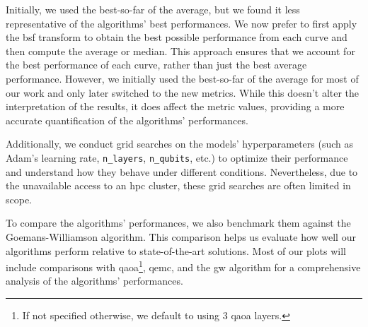 Initially, we used the best-so-far of the average, but we found it less representative of the algorithms' best performances. We now prefer to first apply the \acrshort{bsf} transform to obtain the best possible performance from each curve and then compute the average or median. This approach ensures that we account for the best performance of each curve, rather than just the best average performance. However, we initially used the best-so-far of the average for most of our work and only later switched to the new metrics. While this doesn't alter the interpretation of the results, it does affect the metric values, providing a more accurate quantification of the algorithms' performances.

Additionally, we conduct grid searches on the models' hyperparameters (such as Adam's learning rate, \texttt{n\_layers}, \texttt{n\_qubits}, etc.) to optimize their performance and understand how they behave under different conditions. Nevertheless, due to the unavailable access to an \acrshort{hpc} cluster, these grid searches are often limited in scope.

To compare the algorithms' performances, we also benchmark them against the Goemans-Williamson algorithm. This comparison helps us evaluate how well our algorithms perform relative to state-of-the-art solutions. Most of our plots will include comparisons with \acrshort{qaoa}\footnote{If not specified otherwise, we default to using $3$ \acrshort{qaoa} layers.}, \acrshort{qemc}, and the \acrshort{gw} algorithm for a comprehensive analysis of the algorithms' performances.
